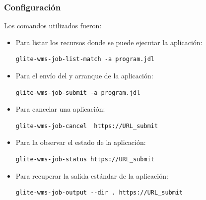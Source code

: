 \documentclass[10pt]{beamer}
\begin{document}
\begin{frame}[fragile]
\frametitle{Configuración}

Los comandos utilizados fueron:
\begin{itemize}

\item Para listar los recursos donde se puede ejecutar la aplicación:
\begin{verbatim}
glite-wms-job-list-match -a program.jdl
\end{verbatim}

\item Para el envío del y arranque de la aplicación:
\begin{verbatim}
glite-wms-job-submit -a program.jdl
\end{verbatim}
\item Para cancelar una aplicación:
\begin{verbatim}
glite-wms-job-cancel  https://URL_submit
\end{verbatim}

\item Para la observar el estado de la aplicación:
\begin{verbatim}
glite-wms-job-status https://URL_submit
\end{verbatim}

\item Para recuperar la salida estándar  de la aplicación:
\begin{verbatim}
glite-wms-job-output --dir . https://URL_submit
\end{verbatim}

\end{itemize}

\end{frame}
\end{document}
